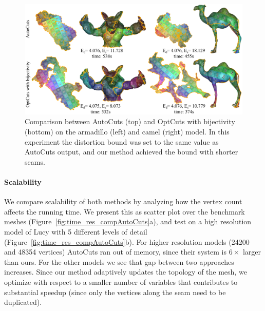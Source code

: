 \begin{figure}[t]
\centering
\includegraphics[width=\linewidth]{fig/comp_AutoCuts.png}
\caption{Comparison between AutoCuts (top) and OptCuts with bijectivity (bottom) on the armadillo (left) and camel (right) model. In this experiment the distortion bound was set to the same value as AutoCuts output, and our method achieved the bound with shorter seams. }
\label{fig:comp_AutoCuts}
\end{figure}

\paragraph{Scalability}
We compare scalability of both methods by analyzing how the vertex count affects the running time. 
We present this as scatter plot over the benchmark meshes (Figure~\ref{fig:time_res_compAutoCuts}a), 
and test on a high resolution model of Lucy with 5 different levels of detail (Figure~\ref{fig:time_res_compAutoCuts}b). 
For higher resolution models (24200 and 48354 vertices) AutoCuts ran out of memory, since their system is $6\times$ 
larger than ours. For the other models we see that gap between two approaches increases. Since our method 
adaptively updates the topology of the mesh, we optimize with respect to a smaller number of variables that contributes
to substantial speedup (since only the vertices along the seam need to be duplicated). 
%


